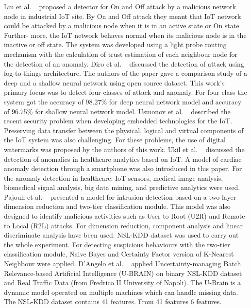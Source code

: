 Liu et al. ~\cite{LiuLLY18} proposed a detector for On and Off attack by a malicious network node in industrial IoT site. 
By On and Off attack they meant that IoT network could be attacked by a malicious node when it is in an active state or On state. 
Further- more, the IoT network behaves normal when its malicious node is in the inactive or off state. 
The system was developed using a light probe routing mechanism with the calculation of trust estimation of each neighbour node for the detection of an anomaly. 
Diro et al. ~\cite{DIRO2018761} discussed the detection of attack using fog-to-things architecture. 
The authors of the paper gave a comparison study of a deep and a shallow neural network using open source dataset. 
This work’s primary focus was to detect four classes of attack and anomaly. 
For four class the system got the accuracy of 98.27\% for deep neural network model and accuracy of 96.75\% for shallow neural network model. 
Usmonov et al. ~\cite{Usmonov8188589} described the recent security problem when developing embedded technologies for the IoT. 
Preserving data transfer between the physical, logical and virtual components of the IoT system was also challenging. 
For these problems, the use of digital watermarks was proposed by the authors of this work. 
Ukil et al. ~\cite{Ukil7474197} discussed the detection of anomalies in healthcare analytics based on IoT. 
A model of cardiac anomaly detection through a smartphone was also introduced in this paper. 
For the anomaly detection in healthcare; IoT sensors, medical image analysis, biomedical signal analysis, big data mining, and predictive analytics were used. 
Pajouh et al. ~\cite{Pajouh7762123} presented a model for intrusion detection based on a two-layer dimension reduction and two-tier classification module. 
This model was also designed to identify malicious activities such as User to Root (U2R) and Remote to Local (R2L) attacks. For dimension reduction, 
component analysis and linear discriminate analysis have been used. NSL-KDD dataset was used to carry out the whole experiment. 
For detecting suspicious behaviours with the two-tier classification module, Naive Bayes and Certainty Factor version of K-Nearest Neighbour were applied. 
D’Angelo et al. ~\cite{DANGELO2015408}  applied Uncertainty-managing Batch Relevance-based Artificial Intelligence (U-BRAIN) on binary NSL-KDD dataset and 
Real Traffic Data (from Fredrico II University of Napoli). The U-Brain is a dynamic model operated on multiple machines which can handle missing data. 
The NSL-KDD dataset contains 41 features. From 41 features 6 features.

